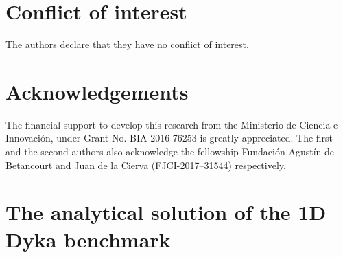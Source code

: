 \documentclass[preprint,12pt,a4paper]{elsarticle}
\begin{document}
% 
\section*{Conflict of interest}
%
The authors declare that they have no conflict of interest.

% 
\section*{Acknowledgements}
%
The financial support to develop this research from the Ministerio de Ciencia e Innovaci\'on, under Grant No. BIA-2016-76253 is greatly appreciated. The first and the second authors also acknowledge the fellowship Fundaci\'on Agust\'in de Betancourt and Juan de la Cierva (FJCI-2017–31544) respectively.


\printglossaries

\appendix

\section{The analytical solution of the 1D Dyka benchmark}
\label{app:analytical_sol}
\end{document}
